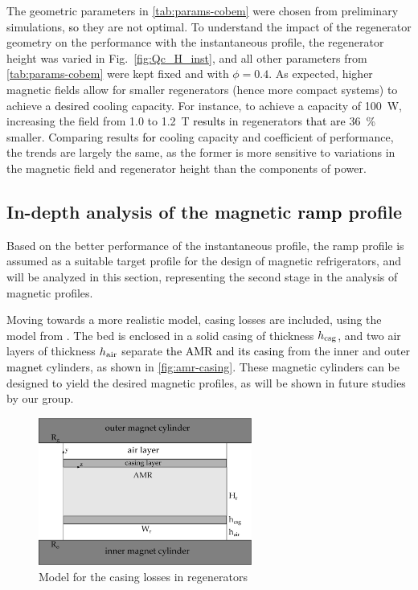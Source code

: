 \documentclass[referee]{svjour3}
\begin{document}
The geometric parameters in \autoref{tab:params-cobem} were chosen from preliminary simulations, \textcolor{black}{so} they are not  optimal. To understand the impact of \textcolor{black}{the} regenerator geometry on the performance with the instantaneous profile, the regenerator height was varied in Fig.~\ref{fig:Qc_H_inst}, and all other parameters from \autoref{tab:params-cobem} were kept fixed and with $\phi=0.4$. As expected, higher magnetic fields allow for smaller regenerators (hence more compact systems) to achieve a \textcolor{black}{desired} cooling capacity. For instance, to achieve a capacity of \SI{100}{\watt}, increasing the field from \num{1.0} to \SI{1.2}{\tesla} \textcolor{black}{results} in regenerators \textcolor{black}{that are} \SI{36}{\percent} smaller. Comparing results \textcolor{black}{for} cooling capacity and coefficient of performance, the trends are largely the same, as the former is more sensitive to variations in the magnetic field and regenerator height than the components of power.


\subsection{In-depth analysis of the  magnetic \textcolor{black}{ramp} profile}
\label{sec:performance-an-amr-1}

Based on the better performance of the instantaneous profile, the ramp profile is assumed as a suitable target profile for the design of magnetic refrigerators, and will be analyzed in this section, representing the second stage in the analysis of magnetic profiles.

Moving towards a more realistic model, casing losses are included, using the model from \cite{bib:trevizoli16_perfor_model}. The bed is enclosed in a solid casing of thickness $h_{\mathrm{csg}}$, and two air layers of thickness $h_{\mathrm{air}}$ separate \textcolor{black}{the AMR and its casing} from the inner and outer \textcolor{black}{magnet} cylinders, as shown in \autoref{fig:amr-casing}. These magnetic cylinders can be designed to yield the desired magnetic profiles, as will be shown in future studies by our group. 

\begin{figure}[!ht]
  \centering
  \includegraphics[width=7cm]{amr-casing}
  \caption{Model for the casing losses in regenerators}
  \label{fig:amr-casing}
\end{figure}
\end{document}
